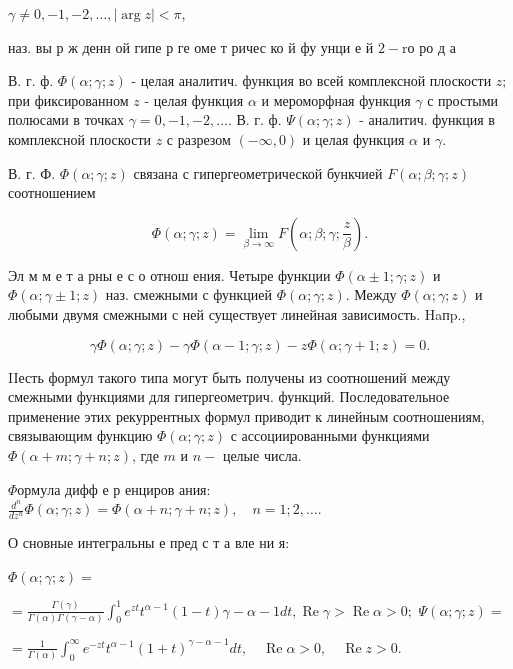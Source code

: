 \documentclass[10pt]{article}
\begin{document}
$\gamma \neq 0,-1,-2, \ldots,|\arg z|<\pi$,



наз. вы р ж денн ой гипе р ге оме т ричес ко й фу унци е й $2-\mathrm{r} о$ ро д а



В. г. ф. $\Phi(\alpha ; \gamma ; z)$ - целая аналитич. функция во всей комплексной плоскости $z ;$ при фиксированном $z$ - целая функция $\alpha$ и мероморфная функция $\gamma$ с простыми полюсами в точках $\gamma=0,-1,-2, \ldots$. В. г. ф. $\Psi(\alpha ; \gamma ; z)$ - аналитич. функция в комплексной плоскости $z$ с разрезом $(-\infty, 0)$ и целая функция $\alpha$ и $\gamma$.



В. г. Ф. $\Phi(\alpha ; \gamma ; z)$ связана с гипергеометрической бункчией $F(\alpha ; \beta ; \gamma ; z)$ соотношением



\[

\Phi(\alpha ; \gamma ; z)=\lim _{\beta \rightarrow \infty} F\left(\alpha ; \beta ; \gamma ; \frac{z}{\beta}\right) .

\]



Эл м м е т а рны е с о отнош ения. Четыре функции $\Phi(\alpha \pm 1 ; \gamma ; z)$ и $\Phi(\alpha ; \gamma \pm 1 ; z)$ наз. смежными с функцией $\Phi(\alpha ; \gamma ; z)$. Между $\Phi(\alpha ; \gamma ; z)$ и любыми двумя смежными с ней существует линейная зависимость. Haпp.,



\[

\gamma \Phi(\alpha ; \gamma ; z)-\gamma \Phi(\alpha-1 ; \gamma ; z)-z \Phi(\alpha ; \gamma+1 ; z)=0 .

\]



IIесть формул такого типа могут быть получены из соотношений между смежными функциями для гипергеометрич. функций. Последовательное применение этих рекуррентных формул приводит к линейным соотношениям, связывающим функцию $\Phi(\alpha ; \gamma ; z)$ с ассоциированными функциями $\Phi(\alpha+m ; \gamma+n ; z)$, где $m$ и $n-$ целые числа.



$\Phi о р м у л а$ дифф е р енциров ания: $\frac{d^{n}}{d z^{n}} \Phi(\alpha ; \gamma ; z)=\Phi(\alpha+n ; \gamma+n ; z), \quad n=1 ; 2, \ldots$.



О сновные интегральны е пред с т а вле ни я:



$\Phi(\alpha ; \gamma ; z)=$



$=\frac{\Gamma(\gamma)}{\Gamma(\alpha) \Gamma(\gamma-\alpha)} \int_{0}^{1} e^{z t} t^{\alpha-1}(1-t) \gamma-\alpha-1 d t, \operatorname{Re} \gamma>\operatorname{Re} \alpha>0 ;$ $\Psi(\alpha ; \gamma ; z)=$



$=\frac{1}{\Gamma(\alpha)} \int_{0}^{\infty} e^{-z t} t^{\alpha-1}(1+t)^{\gamma-\alpha-1} d t, \quad \operatorname{Re} \alpha>0, \quad \operatorname{Re} z>0$.
\end{document}
